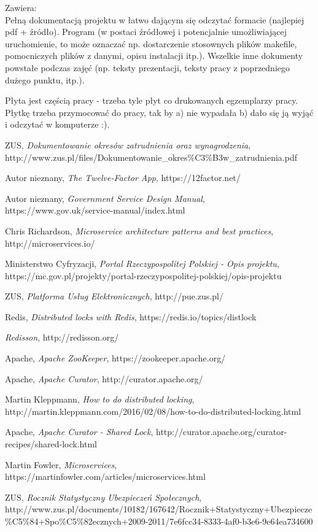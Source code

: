 \documentclass[licencjacka]{pracamgr}
\begin{document}
Zawiera:\\
Pełną dokumentacją projektu w łatwo dającym się odczytać formacie (najlepiej pdf + źródło).
Program (w postaci źródłowej i potencjalnie umożliwiającej uruchomienie, to może oznaczać np. dostarczenie stosownych plików makefile, pomocniczych plików z danymi, opisu instalacji itp.).
Wszelkie inne dokumenty powstałe podczas zajęć (np. teksty prezentacji, teksty pracy z poprzedniego dużego punktu, itp.).

Płyta jest częścią pracy - trzeba tyle płyt co drukowanych egzemplarzy pracy. Płytkę trzeba przymocować do pracy, tak by a) nie wypadała b) dało się ją wyjąć i odczytać w komputerze :).

\begin{thebibliography}{99}

 ZUS, \textit{Dokumentowanie okresów zatrudnienia oraz
	wynagrodzenia}, http://www.zus.pl/files/Dokumentowanie\_okres\%C3\%B3w\_zatrudnienia.pdf

 Autor nieznany, \textit{The Twelve-Factor App}, https://12factor.net/

 Autor nieznany, \textit{Government Service Design Manual},
https://www.gov.uk/service-manual/index.html

 Chris Richardson, \textit{Microservice architecture patterns and best practices},
http://microservices.io/

 Ministerstwo Cyfryzacji, \textit{Portal Rzeczypospolitej Polskiej - Opis projektu},
https://mc.gov.pl/projekty/portal-rzeczypospolitej-polskiej/opis-projektu

 ZUS, \textit{Platforma Usług Elektronicznych},
http://pue.zus.pl/

 Redis, \textit{Distributed locks with Redis},
https://redis.io/topics/distlock

 \textit{Redisson},
http://redisson.org/

 Apache, \textit{Apache ZooKeeper},
https://zookeeper.apache.org/

 Apache, \textit{Apache Curator},
http://curator.apache.org/

 Martin Kleppmann, \textit{How to do distributed locking},
http://martin.kleppmann.com/2016/02/08/how-to-do-distributed-locking.html

 Apache, \textit{Apache Curator - Shared Lock},
http://curator.apache.org/curator-recipes/shared-lock.html

 Martin Fowler, \textit{Microservices},
https://martinfowler.com/articles/microservices.html

 ZUS, \textit{Rocznik Statystyczny Ubezpieczeń Społecznych},
http://www.zus.pl/documents/10182/167642/Rocznik+Statystyczny+Ubezpiecze\%C5\%84+Spo\%C5\%82ecznych+2009-2011/7e6fcc34-8333-4af0-b3e6-9e64ea734600

\end{thebibliography}
\end{document}
